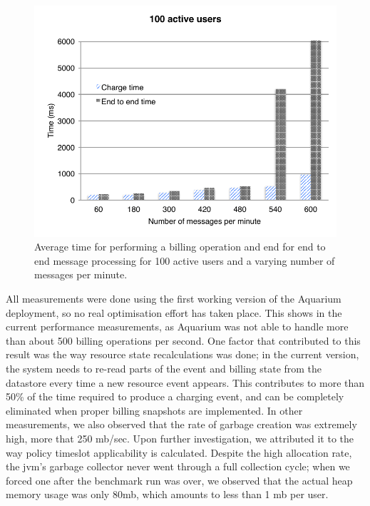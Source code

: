 \documentclass[letterpaper,twocolumn,10pt]{article}
\begin{document}
\begin{figure}[t]
    \begin{center}
        \includegraphics[scale=0.63]{perf.pdf}
    \end{center}

    \caption{Average time for performing a billing operation and end
      for end to end message processing for 100 active users and a
      varying number of messages per minute.}
    
    \label{fig:perf}
\end{figure}

All measurements were done using the first working version of the Aquarium
deployment, so no real optimisation effort has taken place. This shows in the
current performance measurements, as Aquarium was not able to handle more than
about 500 billing operations per second. One factor that contributed to this
result was the way resource state recalculations was done; in the current
version, the system needs to re-read parts of the event and billing state from
the datastore every time a new resource event appears. This contributes to more
than 50\% of the time required to produce a charging event, and can be
completely eliminated when proper billing snapshots are implemented. In other
measurements, we also observed that the rate of garbage creation was extremely
high, more that 250 {\sc mb}/sec. Upon further investigation, we attributed it
to the way policy timeslot applicability is calculated. Despite the high
allocation rate, the {\sc jvm}'s garbage collector never went through a
full collection cycle; when we forced one after the benchmark run was over, 
we observed that the actual heap memory usage was only 80{\sc mb}, which
amounts to less than 1 {\sc mb} per user.
\end{document}
